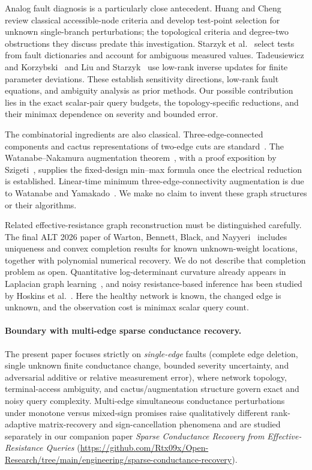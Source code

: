 \documentclass[11pt,letterpaper]{article}
\begin{document}
Analog fault diagnosis is a particularly close antecedent. Huang and Cheng~\cite{HC} review classical accessible-node criteria and develop test-point selection for unknown single-branch perturbations; the topological criteria and degree-two obstructions they discuss predate this investigation. Starzyk et al.~\cite{Starzyk} select tests from fault dictionaries and account for ambiguous measured values. Tadeusiewicz and Korzybski~\cite{TK} and Liu and Starzyk~\cite{LS} use low-rank inverse updates for finite parameter deviations. These establish sensitivity directions, low-rank fault equations, and ambiguity analysis as prior methods. Our possible contribution lies in the exact scalar-pair query budgets, the topology-specific reductions, and their minimax dependence on severity and bounded error.

The combinatorial ingredients are also classical. Three-edge-connected components and cactus representations of two-edge cuts are standard~\cite{MNS}. The Watanabe--Nakamura augmentation theorem~\cite{WN}, with a proof exposition by Szigeti~\cite{Szigeti}, supplies the fixed-design min--max formula once the electrical reduction is established. Linear-time minimum three-edge-connectivity augmentation is due to Watanabe and Yamakado~\cite{WY}. We make no claim to invent these graph structures or their algorithms.

Related effective-resistance graph reconstruction must be distinguished carefully. The final ALT 2026 paper of Warton, Bennett, Black, and Nayyeri~\cite{WBBN} includes uniqueness and convex completion results for known unknown-weight locations, together with polynomial numerical recovery. We do not describe that completion problem as open. Quantitative log-determinant curvature already appears in Laplacian graph learning~\cite{YCP}, and noisy resistance-based inference has been studied by Hoskins et al.~\cite{HMMT}. Here the healthy network is known, the changed edge is unknown, and the observation cost is minimax scalar query count.


\paragraph{Boundary with multi-edge sparse conductance recovery.}
The present paper focuses strictly on \emph{single-edge} faults (complete edge deletion, single unknown finite conductance change, bounded severity uncertainty, and adversarial additive or relative measurement error), where network topology, terminal-access ambiguity, and cactus/augmentation structure govern exact and noisy query complexity. Multi-edge simultaneous conductance perturbations under monotone versus mixed-sign promises raise qualitatively different rank-adaptive matrix-recovery and sign-cancellation phenomena and are studied separately in our companion paper \emph{Sparse Conductance Recovery from Effective-Resistance Queries} (\url{https://github.com/Rtx09x/Open-Research/tree/main/engineering/sparse-conductance-recovery}).
\end{document}
